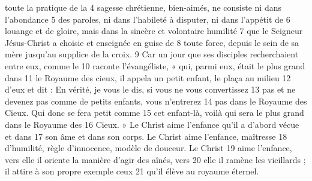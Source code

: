 toute la pratique de la	 
4	 	sagesse chrétienne, bien-aimés, ne consiste ni dans l'abondance	 
5	 	des paroles, ni dans l'habileté à disputer, ni dans l'appétit de	 
6	 	louange et de gloire, mais dans la sincère et volontaire humilité	 
7	 	que le Seigneur Jésus-Christ a choisie et enseignée en guise de	 
8	 	toute force, depuis le sein de sa mère jusqu'au supplice de la croix.	 
9	 	Car un jour que ses disciples recherchaient entre eux, comme le	 
10	 	raconte l'évangéliste, « qui, parmi eux, était le plus grand dans	 
11	 	le Royaume des cieux, il appela un petit enfant, le plaça au milieu	 
12	 	d'eux et dit : En vérité, je vous le dis, si vous ne vous convertissez	 
13	 	pas et ne devenez pas comme de petits enfants, vous n'entrerez	 
14	 	pas dans le Royaume des Cieux. Qui donc se fera petit comme	 
15	 	cet enfant-là, voilà qui sera le plus grand dans le Royaume des	 
16	 	Cieux. » Le Christ aime l'enfance qu'il a d'abord vécue et dans	 
17	 	son âme et dans son corps. Le Christ aime l'enfance, maîtresse	 
18	 	d'humilité, règle d'innocence, modèle de douceur. Le Christ	 
19	 	aime l'enfance, vers elle il oriente la manière d'agir des aînés, vers	 
20	 	elle il ramène les vieillards ; il attire à son propre exemple ceux	 
21	 	qu'il élève au royaume éternel.